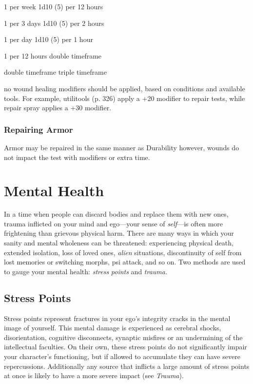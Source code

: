 1 per week
1d10 (5) per 12 hours

1 per 3 days
1d10 (5) per 2 hours

1 per day
1d10 (5) per 1 hour

1 per 12 hours
double timeframe

double timeframe
triple timeframe

no wound healing
modifiers should be applied, based on conditions and 
available tools. For example, utilitools (p. 326) apply 
a +20 modifier to repair tests, while repair spray applies
a +30 modifier.

\subsubsection{Repairing Armor}

Armor may be repaired in the same manner as Durability
however, wounds do not impact the test with
modifiers or extra time.

\section{Mental Health}


In a time when people can discard bodies and 
replace them with new ones, trauma inflicted  on 
your mind and ego—your sense of \textit{self}—is often 
more frightening than grievous physical harm. There 
are many ways in which your sanity and mental 
wholeness can be threatened: experiencing physical 
death, extended isolation, loss of loved ones, \textit{alien}
situations, discontinuity of self from lost memories 
or switching morphs, psi attack, and so on. Two 
methods are used to gauge your mental health: \textit{stress }
\textit{points} and \textit{trauma.}

\subsection{Stress Points}

Stress points represent fractures in your ego's integrity
cracks in the mental image of yourself. This
mental damage is experienced as cerebral shocks, 
disorientation, cognitive disconnects, synaptic misfires
or an undermining of the intellectual faculties.
On their own, these stress points do not significantly 
impair your character's functioning, but if allowed to 
accumulate they can have severe repercussions. Additionally
any source that inflicts a large amount of
stress points at once is likely to have a more severe 
impact (see \textit{Trauma}).


